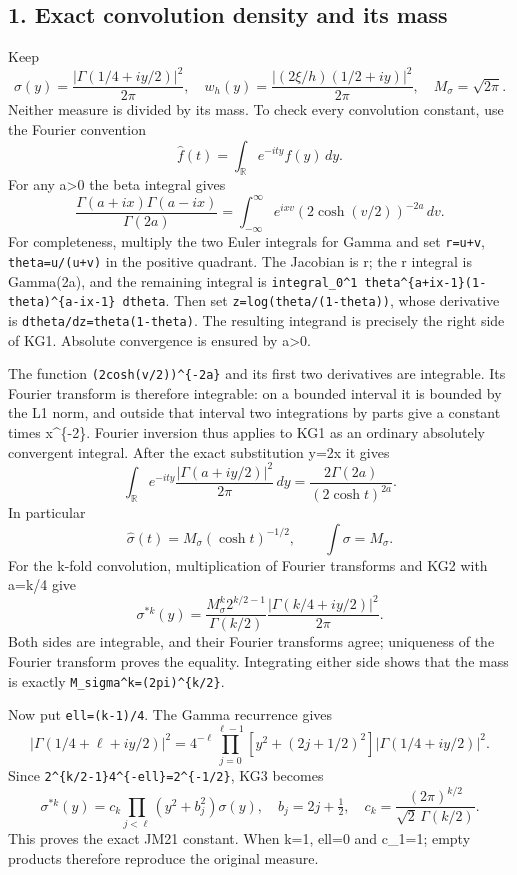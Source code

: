 \documentclass[11pt]{article}
\begin{document}
\subsection{1. Exact convolution density and its mass}\label{mrkg:exact-convolution-density-and-its-mass}

Keep \[
\sigma(y)=\frac{|\Gamma(1/4+iy/2)|^2}{2\pi},\quad
w_h(y)=\frac{|(2\xi/h)(1/2+iy)|^2}{2\pi},\quad
M_\sigma=\sqrt{2\pi}.
\] Neither measure is divided by its mass. To check every convolution constant, use the Fourier convention \[
\widehat f(t)=\int_{\mathbb R}e^{-ity}f(y)\,dy.
\] For any a\textgreater0 the beta integral gives \[
\frac{\Gamma(a+ix)\Gamma(a-ix)}{\Gamma(2a)}
=\int_{-\infty}^{\infty}e^{ixv}(2\cosh(v/2))^{-2a}\,dv.
\tag{KG1}
\] For completeness, multiply the two Euler integrals for Gamma and set \texttt{r=u+v}, \texttt{theta=u/(u+v)} in the positive quadrant. The Jacobian is r; the r integral is Gamma(2a), and the remaining integral is \texttt{integral\_0\^{}1\ theta\^{}\{a+ix-1\}(1-theta)\^{}\{a-ix-1\}\ dtheta}. Then set \texttt{z=log(theta/(1-theta))}, whose derivative is \texttt{dtheta/dz=theta(1-theta)}. The resulting integrand is precisely the right side of KG1. Absolute convergence is ensured by a\textgreater0.

The function \texttt{(2cosh(v/2))\^{}\{-2a\}} and its first two derivatives are integrable. Its Fourier transform is therefore integrable: on a bounded interval it is bounded by the L1 norm, and outside that interval two integrations by parts give a constant times \textbar x\textbar\^{}\{-2\}. Fourier inversion thus applies to KG1 as an ordinary absolutely convergent integral. After the exact substitution y=2x it gives \[
\int_{\mathbb R}e^{-ity}
\frac{|\Gamma(a+iy/2)|^2}{2\pi}\,dy
=\frac{2\Gamma(2a)}{(2\cosh t)^{2a}}.
\tag{KG2}
\] In particular \[
\widehat\sigma(t)=M_\sigma(\cosh t)^{-1/2},\qquad
\int\sigma=M_\sigma.
\] For the k-fold convolution, multiplication of Fourier transforms and KG2 with a=k/4 give \[
\sigma^{*k}(y)=
\frac{M_\sigma^k2^{k/2-1}}{\Gamma(k/2)}
\frac{|\Gamma(k/4+iy/2)|^2}{2\pi}.
\tag{KG3}
\] Both sides are integrable, and their Fourier transforms agree; uniqueness of the Fourier transform proves the equality. Integrating either side shows that the mass is exactly \texttt{M\_sigma\^{}k=(2pi)\^{}\{k/2\}}.

Now put \texttt{ell=(k-1)/4}. The Gamma recurrence gives \[
|\Gamma(1/4+\ell+iy/2)|^2
=4^{-\ell}\prod_{j=0}^{\ell-1}
 \left[y^2+(2j+1/2)^2\right]|\Gamma(1/4+iy/2)|^2.
\] Since \texttt{2\^{}\{k/2-1\}4\^{}\{-ell\}=2\^{}\{-1/2\}}, KG3 becomes \[
\boxed{\sigma^{*k}(y)=c_k\prod_{j<\ell}(y^2+b_j^2)\sigma(y),
\quad b_j=2j+\tfrac12,\quad
c_k=\frac{(2\pi)^{k/2}}{\sqrt2\,\Gamma(k/2)}.}
\tag{KG4}
\] This proves the exact JM21 constant. When k=1, ell=0 and c\_1=1; empty products therefore reproduce the original measure.
\end{document}

